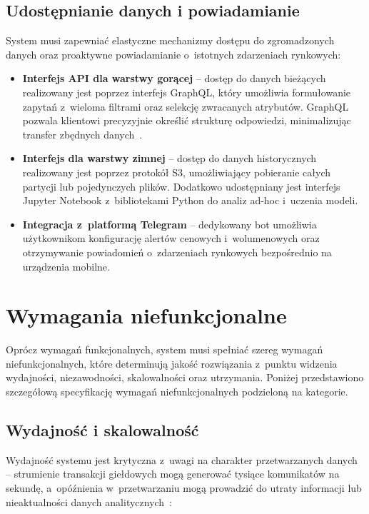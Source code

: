 \subsection{Udostępnianie danych i powiadamianie}
\label{subsec:udostepnianie_danych}

System musi zapewniać elastyczne mechanizmy dostępu do zgromadzonych danych oraz proaktywne powiadamianie
o~istotnych zdarzeniach rynkowych:

\begin{itemize}
    \item \textbf{Interfejs API dla warstwy gorącej} -- dostęp do danych bieżących realizowany jest poprzez interfejs
    GraphQL, który umożliwia formułowanie zapytań z~wieloma filtrami oraz selekcję zwracanych atrybutów.
    GraphQL pozwala klientowi precyzyjnie określić strukturę odpowiedzi, minimalizując transfer zbędnych danych~\cite{graphql_rest_comparative}.
    \item \textbf{Interfejs dla warstwy zimnej} -- dostęp do danych historycznych realizowany jest poprzez protokół S3,
    umożliwiający pobieranie całych partycji lub pojedynczych plików.
    Dodatkowo udostępniany jest interfejs Jupyter Notebook z~bibliotekami Python do analiz ad-hoc i~uczenia modeli.
    \item \textbf{Integracja z~platformą Telegram} -- dedykowany bot umożliwia użytkownikom konfigurację alertów
    cenowych i~wolumenowych oraz otrzymywanie powiadomień o~zdarzeniach rynkowych bezpośrednio na urządzenia mobilne.
\end{itemize}


\section{Wymagania niefunkcjonalne}
\label{sec:wymagania_niefunkcjonalne}

Oprócz wymagań funkcjonalnych, system musi spełniać szereg wymagań niefunkcjonalnych, które determinują jakość
rozwiązania z~punktu widzenia wydajności, niezawodności, skalowalności oraz utrzymania.
Poniżej przedstawiono szczegółową specyfikację wymagań niefunkcjonalnych podzieloną na kategorie.

\subsection{Wydajność i skalowalność}
\label{subsec:wydajnosc}

Wydajność systemu jest krytyczna z~uwagi na charakter przetwarzanych danych -- strumienie transakcji giełdowych mogą
generować tysiące komunikatów na sekundę, a~opóźnienia w~przetwarzaniu mogą prowadzić do utraty informacji lub
nieaktualności danych analitycznych~\cite{time_value_curve}:

